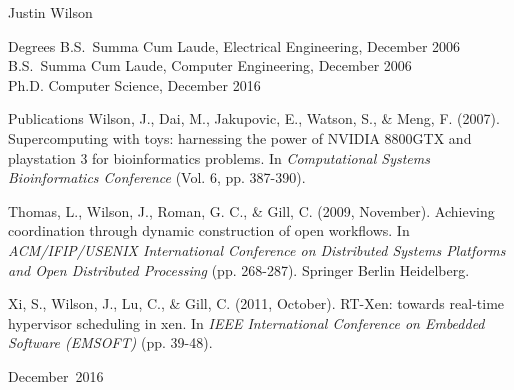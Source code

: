 \documentclass[phdthesis,12pt]{wuthesis}
\renewcommand{\thesisauthor}{Justin Wilson}
\renewcommand{\thesismonth}{December}
\renewcommand{\thesisyear}{2016}
\begin{document}
\begin{thesisauthorvita}
%
%
\begin{center}
{\large\thesisauthor}
\end{center}
%
%
\newcommand{\vitalabel}[1]%
  {\raisebox{0pt}[1ex][0pt]
    {\makebox[\labelwidth][l]%
      {\parbox[t]{\labelwidth}{\hspace{0pt}\textbf{#1}}}}}
%
%
\begin{list}
  {}%
  { \renewcommand{\makelabel}{\vitalabel}%
    \setlength{\labelwidth}{100pt}%
    \setlength{\leftmargin}{120pt}%
    \setlength{\itemindent}{0pt}%
    \setlength{\parsep}{\baselineskip}%
    \setlength{\itemsep}{5pt}%
    }

\item[Degrees] B.S.\ Summa Cum Laude, Electrical Engineering, December 2006 \\
               B.S.\ Summa Cum Laude, Computer Engineering, December 2006 \\
               Ph.D. Computer Science, December 2016
\item[Publications]
  Wilson, J., Dai, M., Jakupovic, E., Watson, S., \& Meng, F. (2007). Supercomputing with toys: harnessing the power of NVIDIA 8800GTX and playstation 3 for bioinformatics problems. In \textit{Computational Systems Bioinformatics Conference} (Vol. 6, pp. 387-390).

  Thomas, L., Wilson, J., Roman, G. C., \& Gill, C. (2009, November). Achieving coordination through dynamic construction of open workflows. In \textit{ACM/IFIP/USENIX International Conference on Distributed Systems Platforms and Open Distributed Processing} (pp. 268-287). Springer Berlin Heidelberg.

  Xi, S., Wilson, J., Lu, C., \& Gill, C. (2011, October). RT-Xen: towards real-time hypervisor scheduling in xen. In \textit{IEEE International Conference on Embedded Software (EMSOFT)} (pp. 39-48).
\end{list}
\flushright
\thesismonth\ \thesisyear
\end{thesisauthorvita}
\end{document}
